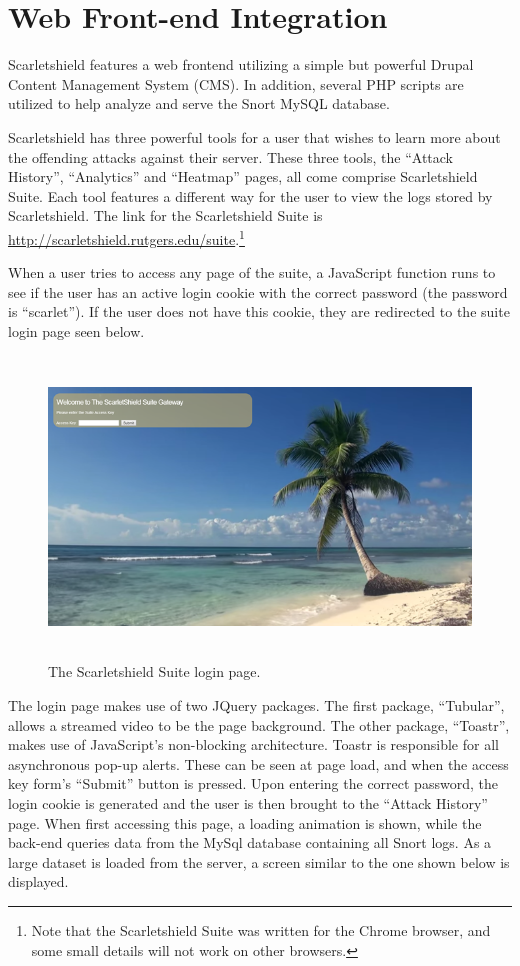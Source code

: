 \documentclass[11.5pt,letterpaper,titlepage]{report}
\begin{document}
\section{Web Front-end Integration}


Scarletshield features a web frontend utilizing a simple but powerful Drupal
Content Management System (CMS).  In addition, several PHP scripts are
utilized to help analyze and serve the Snort MySQL database.

Scarletshield has three powerful tools for a user that wishes to learn more
about the offending attacks against their server. These three tools, the ``Attack
History'', ``Analytics'' and ``Heatmap'' pages, all come comprise
Scarletshield Suite. Each tool features a different way for the user to view
the logs stored by Scarletshield. The link for the Scarletshield Suite is
\url{http://scarletshield.rutgers.edu/suite}.\footnote{Note that the Scarletshield Suite was
written for the Chrome browser, and some small details will not work on other
browsers.}

When a user tries to access any page of the suite, a JavaScript function runs to
see if the user has an active login cookie with the correct password (the
password is ``scarlet'').  If the user does not have this cookie, they are
redirected to the suite login page seen below.

\begin{figure}[h!]
\centering
  \includegraphics[height=8cm]{./login.png}
  \caption{The Scarletshield Suite login page.}
\end{figure}

The login page makes use of two JQuery packages.  The first package,
``Tubular'', allows a streamed video to be the page background.  The other
package, ``Toastr'', makes use of JavaScript’s non-blocking
architecture.  Toastr is responsible for all asynchronous pop-up alerts.  These
can be seen at page load, and when the access key form's ``Submit'' button is
pressed. Upon entering the correct password, the login cookie is generated and
the user is then brought to the ``Attack History'' page. When first accessing this
page, a loading animation is shown, while the back-end queries data from the MySql
database containing all Snort logs. As a large dataset is loaded from the
server, a screen similar to the one shown below is displayed.
\end{document}
